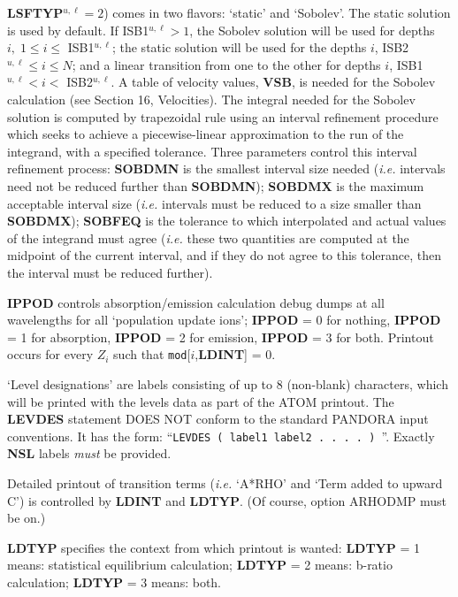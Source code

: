 {\bf LSFTYP}$^{u,\ell} = 2$) comes in two flavors: `static' and
`Sobolev'. The static solution is used by default. If ISB1$^{u, \ell} 
> 1$, the Sobolev solution will be used for depths $i, \; 1 \leq i
\leq $ ISB1$^{u, \ell}$; the static solution will be used for the 
depths $i$, ISB2$^{u, \ell} \leq i \leq N$; and a linear
transition from one to the other for depths $i$, ISB1$^{u, \ell}
 < i < $ ISB2$^{u, \ell}$. \np
A table of velocity values, {\bf VSB}, is needed for the Sobolev calculation
(see Section 16, Velocities). \np
The integral needed for the Sobolev solution is computed by trapezoidal rule
using an interval refinement procedure which seeks to achieve a
piecewise-linear approximation to the run of the integrand, with a specified
tolerance. Three parameters control this interval refinement process:
{\bf SOBDMN} is the smallest interval size needed ({\it i.e.} intervals need
not be reduced further than {\bf SOBDMN}); {\bf SOBDMX} is the maximum 
acceptable interval size ({\it i.e.} intervals must be reduced to a size smaller
than {\bf SOBDMX}); {\bf SOBFEQ} is the tolerance to which interpolated and
actual values of the integrand must agree ({\it i.e.} these two quantities
are computed at the midpoint of the current interval, and if they do not
agree to this tolerance, then the interval must be reduced further).
\blankline
\blankline
\centerline{}
\space \noindent
{\bf IPPOD} controls absorption/emission calculation debug dumps at all
wavelengths for all `population update ions'; {\bf IPPOD} = 0 for nothing,
{\bf IPPOD} = 1 for absorption, {\bf IPPOD} = 2 for emission, {\bf IPPOD} = 3
for both. Printout occurs for every $Z_i$ such that {\tt mod}[$i$,{\bf LDINT}]
= 0.
\blankline
\blankline
\centerline{}
\space \noindent
`Level designations' are {\alfa} labels consisting of up to 8 (non-blank)
characters, which will be printed with the levels data as part of the
ATOM printout. \np
The {\bf LEVDES} statement DOES NOT conform to the standard
PANDORA input conventions. It has the form: \np
``{\tt LEVDES ( label1 label2 . . . . ) }''. \np
Exactly {\bf NSL} labels {\it must} be provided.
\ej
\centerline{}
\space \noindent
Detailed printout of transition terms ({\it i.e.} `A*RHO' and `Term added
to upward C') is controlled by {\bf LDINT} and {\bf LDTYP}.
(Of course, option ARHODMP must be on.)

{\bf LDTYP}
specifies the context from which printout is wanted: \np
{\bf LDTYP} = 1 means: statistical equilibrium calculation; \np
{\bf LDTYP} = 2 means: b-ratio calculation; \np
{\bf LDTYP} = 3 means: both.

